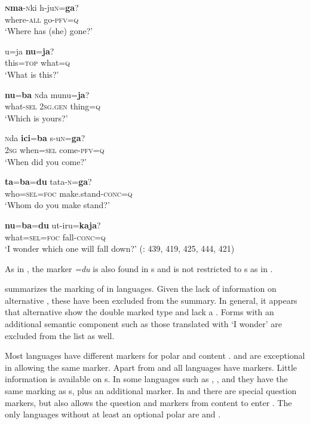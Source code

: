     \ex
    \gll \textbf{\textsc{n}}\textbf{{ma}}-\textsc{n}ki  h-ju\textsc{n}=\textbf{{ga}}?\\
    where-\textsc{all}  go-\textsc{pfv}=\textsc{q}\\
    \glt ‘Where has (she) gone?’
    
    \ex
    \gll u=ja \textbf{{nu}}=\textbf{{ja}}?\\
    this=\textsc{top}  what=\textsc{q}\\
    \glt ‘What is this?’
    
    \ex
    \gll \textbf{{nu}}=\textbf{{ba}} \textsc{n}da    munu=\textbf{{ja}}?\\
    what-\textsc{sel}  2\textsc{sg}.\textsc{gen}  thing=\textsc{q}\\
    \glt ‘Which is yours?’
    
    \ex
    \gll \textsc{n}da \textbf{{ici}}=\textbf{{ba}} s-u\textsc{n}=\textbf{{ga}}?\\
    2\textsc{sg}  when=\textsc{sel}  come-\textsc{pfv}=\textsc{q}\\
    \glt ‘When did you come?’
    
    \ex
    \gll \textbf{{ta}}=\textbf{{ba}}=\textbf{{du}} tata-\textsc{n}=\textbf{{ga}}?\\
    who=\textsc{sel}=\textsc{foc}    make.stand-\textsc{conc}=\textsc{q}\\
    \glt ‘Whom do you make stand?’
    
    \ex
    \gll \textbf{{nu}}=\textbf{{ba}}=\textbf{{du}} ut-iru=\textbf{{kaja}}?\\
    what=\textsc{sel}=\textsc{foc}  fall-\textsc{conc}=\textsc{q}\\
    \glt ‘I wonder which one will fall down?’ (\citealt{Izuyama2012}: 439, 419, 425, 444, 421)\z\z

\noindent As in , the  marker \textit{=du} is also found in s and is not restricted to s as in .

 summarizes the marking of  in  languages. Given the lack of information on alternative , these have been excluded from the summary. In general, it appears that alternative  show the double marked type and lack a . Forms with an additional semantic component such as those translated with ‘I wonder’ are excluded from the list as well.

Most languages have different markers for polar and content .  and  are exceptional in allowing the same marker. Apart from  and  all languages have  markers. Little information is available on s. In some languages such as , , and  they have the same marking as s, plus an additional  marker. In  and  there are special question markers, but  also allows the question and  markers from content  to enter  . The only languages without at least an optional polar  are  and .

